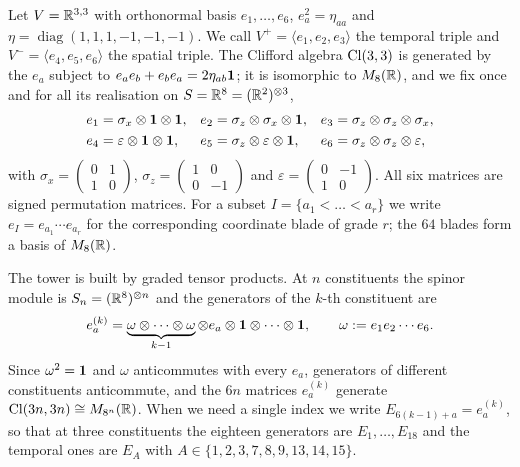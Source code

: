 Let $V=\mathbb{R}^{3,3}$ with orthonormal basis $e_1,\dots,e_6$, $e_a^2=\eta_{aa}$ and $\eta=\operatorname{diag}(1,1,1,-1,-1,-1)$.
We call $V^+=\langle e_1,e_2,e_3\rangle$ the temporal triple and $V^-=\langle e_4,e_5,e_6\rangle$ the spatial triple. The
Clifford algebra $\mathrm{Cl}(3,3)$ is generated by the $e_a$ subject to $e_ae_b+e_be_a=2\eta_{ab}\mathbf 1$; it is isomorphic to
$M_8(\mathbb{R})$, and we fix once and for all its realisation on $S=\mathbb{R}^8=(\mathbb{R}^2)^{\otimes3}$,
\begin{equation}
\label{eq:realisation}
\begin{aligned}
e_1&=\sigma_x\otimes\mathbf 1\otimes\mathbf 1, & e_2&=\sigma_z\otimes\sigma_x\otimes\mathbf 1, & e_3&=\sigma_z\otimes\sigma_z\otimes\sigma_x,\\
e_4&=\varepsilon\otimes\mathbf 1\otimes\mathbf 1, & e_5&=\sigma_z\otimes\varepsilon\otimes\mathbf 1, & e_6&=\sigma_z\otimes\sigma_z\otimes\varepsilon,
\end{aligned}
\end{equation}
with $\sigma_x=\left(\begin{smallmatrix}0&1\\1&0\end{smallmatrix}\right)$,
$\sigma_z=\left(\begin{smallmatrix}1&0\\0&-1\end{smallmatrix}\right)$ and
$\varepsilon=\left(\begin{smallmatrix}0&-1\\1&0\end{smallmatrix}\right)$. All six matrices are signed permutation
matrices. For a subset $I=\{a_1<\dots<a_r\}$ we write $e_I=e_{a_1}\cdots e_{a_r}$ for the corresponding coordinate blade of grade $r$;
the $64$ blades form a basis of $M_8(\mathbb{R})$.

The tower is built by graded tensor products. At $n$ constituents the spinor module is $S_n=(\mathbb{R}^8)^{\otimes n}$ and the
generators of the $k$-th constituent are
\begin{equation}
\label{eq:tower}
e^{(k)}_a=\underbrace{\omega\otimes\cdots\otimes\omega}_{k-1}\otimes e_a\otimes\mathbf 1\otimes\cdots\otimes\mathbf 1,
\qquad \omega:=e_1e_2\cdots e_6 .
\end{equation}
Since $\omega^2=\mathbf 1$ and $\omega$ anticommutes with every $e_a$, generators of different constituents anticommute, and the
$6n$ matrices $e^{(k)}_a$ generate $\mathrm{Cl}(3n,3n)\cong M_{8^n}(\mathbb{R})$. When we need a single index we write
$E_{6(k-1)+a}=e^{(k)}_a$, so that at three constituents the eighteen generators are $E_1,\dots,E_{18}$ and the temporal
ones are $E_A$ with $A\in\{1,2,3,7,8,9,13,14,15\}$.

